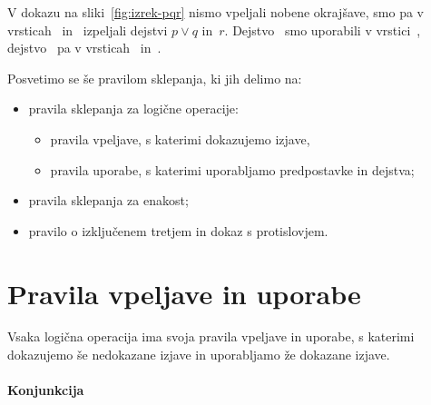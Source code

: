 \begin{zgled}
  V dokazu na sliki~\ref{fig:izrek-pqr} nismo vpeljali nobene okrajšave, smo pa v vrsticah~
  in~ izpeljali dejstvi $p \lor q$ in~$r$. Dejstvo~ smo uporabili v vrstici~, dejstvo~ pa v vrsticah~ in~.
\end{zgled}

Posvetimo se še pravilom sklepanja, ki jih delimo na:
%
\begin{itemize}
\item pravila sklepanja za logične operacije:
  \begin{itemize}[nosep]
  \item pravila vpeljave, s katerimi dokazujemo izjave,
  \item pravila uporabe, s katerimi uporabljamo predpostavke in dejstva;
  \end{itemize}
\item pravila sklepanja za enakost;
\item pravilo o izključenem tretjem in dokaz s protislovjem.
\end{itemize}

\section{Pravila vpeljave in uporabe}

Vsaka logična operacija ima svoja pravila vpeljave in uporabe, s katerimi dokazujemo še nedokazane izjave in uporabljamo že dokazane izjave.

\paragraph*{Konjunkcija}
\label{sec:konjunkcija-pravila}

